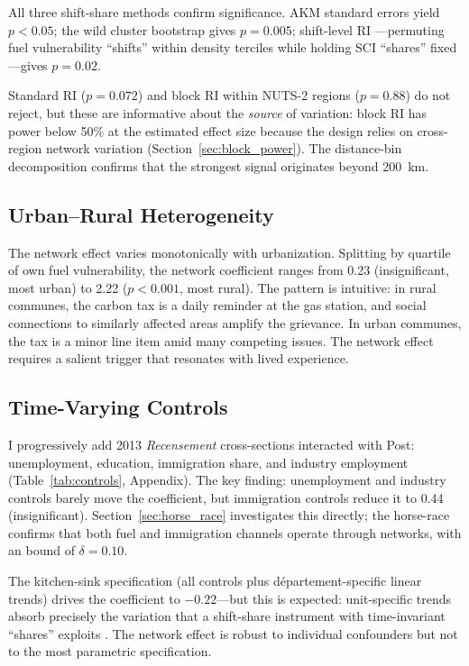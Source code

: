 \documentclass[12pt]{article}
\newcommand{\dept}{d\'{e}partement}
\begin{document}
All three shift-share methods confirm significance. AKM standard errors \citep{adao2019shift} yield $p < 0.05$; the wild cluster bootstrap gives $p = 0.005$; shift-level RI \citep{borusyak2022quasi}---permuting fuel vulnerability ``shifts'' within density terciles while holding SCI ``shares'' fixed---gives $p = 0.02$.

Standard RI ($p = 0.072$) and block RI within NUTS-2 regions ($p = 0.88$) do not reject, but these are informative about the \emph{source} of variation: block RI has power below 50\% at the estimated effect size because the design relies on cross-region network variation (Section~\ref{sec:block_power}). The distance-bin decomposition confirms that the strongest signal originates beyond 200~km.

\subsection{Urban--Rural Heterogeneity}

The network effect varies monotonically with urbanization. Splitting by quartile of own fuel vulnerability, the network coefficient ranges from 0.23 (insignificant, most urban) to 2.22 ($p < 0.001$, most rural). The pattern is intuitive: in rural communes, the carbon tax is a daily reminder at the gas station, and social connections to similarly affected areas amplify the grievance. In urban communes, the tax is a minor line item amid many competing issues. The network effect requires a salient trigger that resonates with lived experience.

\subsection{Time-Varying Controls}

I progressively add 2013 \textit{Recensement} cross-sections interacted with Post: unemployment, education, immigration share, and industry employment (Table~\ref{tab:controls}, Appendix). The key finding: unemployment and industry controls barely move the coefficient, but immigration controls reduce it to 0.44 (insignificant). Section~\ref{sec:horse_race} investigates this directly; the horse-race confirms that both fuel and immigration channels operate through networks, with an \citet{oster2019unobservable} bound of $\delta = 0.10$.

The kitchen-sink specification (all controls plus \dept{}-specific linear trends) drives the coefficient to $-0.22$---but this is expected: unit-specific trends absorb precisely the variation that a shift-share instrument with time-invariant ``shares'' exploits \citep{adao2019shift}. The network effect is robust to individual confounders but not to the most parametric specification.
\end{document}
